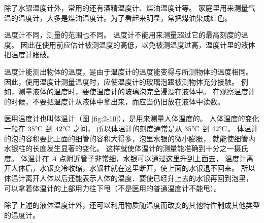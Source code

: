 除了水银温度计外，常用的还有酒精温度计、煤油温度计等。
家庭里用来测量气温的温度计，大多是煤油温度计。为了看起来明显，常把煤油染成红色。

温度计不同，测量的范围也不同。
温度计不能用来测量超过它的最高刻度的温度。
因此在使用前应估计被测温度的高低，以免被测温度过高，温度计里的液体把温度计胀破。

温度计能测出物体的温度，是由于温度计的温度能变得与所测物体的温度相同。
因此，使用温度计测量温度时，应使温度计的玻璃泡跟被测物体充分接触。
例如，测量液体的温度时，要使温度计的玻璃泡完全浸没在液体中。
在观察温度计的时候，不要把温度计从液体中拿出来，而应当仍旧放在液体中读数。

医用温度计也叫体温计（图 \ref{fig:2-10}），是用来测量人体温度的。
人体温度的变化一般在 $35\celsius$ 到 $42\celsius$ 之间，
所以体温计的刻度通常是从 $35\celsius$ 到 $42\celsius$。
体温计的泡的容积要比上面的细管的容积大得多，泡里水银的微小膨胀，
就能使细管内水银柱的长度发生显著的变化。
这样就使体温计的测量能准确到十分之一摄氏度。
体温计在 $A$ 点附近管子非常细，水银可以通过这里升到上面去，
温度计离开人体后，水银变冷收缩，水银柱就在这里断开，使上面的水银退不回来。
所以体温计离开人体以后还能表示人体的温度．要使已经升上去的水银再回到泡里，
可以拿着体温计的上部用力往下甩（不是医用的普通温度计不能甩）。

除了上述的液体温度计外，还可以利用物质随温度而改变的其他特性制成其他类型的温度计。


